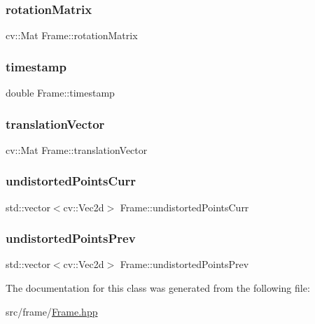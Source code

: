 \mbox{\label{classFrame_ae6b2810e1e9d8cc8a5ba7dff9378b019}} 
\subsubsection{\texorpdfstring{rotation\+Matrix}{rotationMatrix}}
{\footnotesize\ttfamily cv\+::\+Mat Frame\+::rotation\+Matrix}

\mbox{\label{classFrame_a360891231ed2b244f6caf3cfc8c16fb5}} 
\subsubsection{\texorpdfstring{timestamp}{timestamp}}
{\footnotesize\ttfamily double Frame\+::timestamp}

\mbox{\label{classFrame_a5635d2b68ffd5456f6e7ad0f54d1ba29}} 
\subsubsection{\texorpdfstring{translation\+Vector}{translationVector}}
{\footnotesize\ttfamily cv\+::\+Mat Frame\+::translation\+Vector}

\mbox{\label{classFrame_a81aae40549c6b5548cf63d050f7a19e3}} 
\subsubsection{\texorpdfstring{undistorted\+Points\+Curr}{undistortedPointsCurr}}
{\footnotesize\ttfamily std\+::vector$<$cv\+::\+Vec2d$>$ Frame\+::undistorted\+Points\+Curr}

\mbox{\label{classFrame_a9efe87123d623bfe06327036ee59e423}} 
\subsubsection{\texorpdfstring{undistorted\+Points\+Prev}{undistortedPointsPrev}}
{\footnotesize\ttfamily std\+::vector$<$cv\+::\+Vec2d$>$ Frame\+::undistorted\+Points\+Prev}



The documentation for this class was generated from the following file\+:\begin{DoxyCompactItemize}
\item 
src/frame/\hyperlink{Frame_8hpp}{Frame.\+hpp}\end{DoxyCompactItemize}
